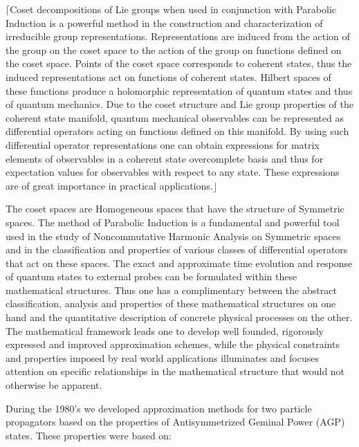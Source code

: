 \documentclass[aps,preprint]{revtex4}%
\begin{document}
$\lceil$Coset decompositions of Lie groups when used in conjunction with
Parabolic Induction is a powerful method in the construction and
characterization of irreducible group representations. Representations are
induced from the action of the group on the coset space to the action of the
group on functions defined on the coset space. Points of the coset space
corresponds to coherent states, thus the induced representations act on
functions of coherent states. Hilbert spaces of these functions produce a
holomorphic representation of quantum states and thus of quantum mechanics.
Due to the coset structure and Lie group properties of the coherent state
manifold, quantum mechanical observables can be represented as differential
operators acting on functions defined on this manifold. By using such
differential operator representations one can obtain expressions for matrix
elements of observables in a coherent state overcomplete basis and thus for
expectation values for observables with respect to any state. These
expressions are of great importance in practical applications.$\rfloor$

The coset spaces are Homogeneous spaces that have the structure of Symmetric
spaces. The method of Parabolic Induction is a fundamental and powerful tool
used in the study of Noncommutative Harmonic Analysis on Symmetric spaces and
in the classification and properties of various classes of differential
operators that act on these spaces. The exact and approximate time evolution
and response of quantum states to external probes can be formulated within
these mathematical structures. Thus one has a complimentary between the
abstract classification, analysis and properties of these mathematical
structures on one hand and the quantitative description of concrete physical
processes on the other. The mathematical framework leads one to develop well
founded, rigorously expressed and improved approximation schemes, while the
physical constraints and properties imposed by real world applications
illuminates and focuses attention on specific relationships in the
mathematical structure that would not otherwise be apparent.

During the 1980's we developed approximation methods for two particle
propagators based on the properties of Antisymmetrized Geminal Power (AGP)
states. These properties were based on:
\end{document}
